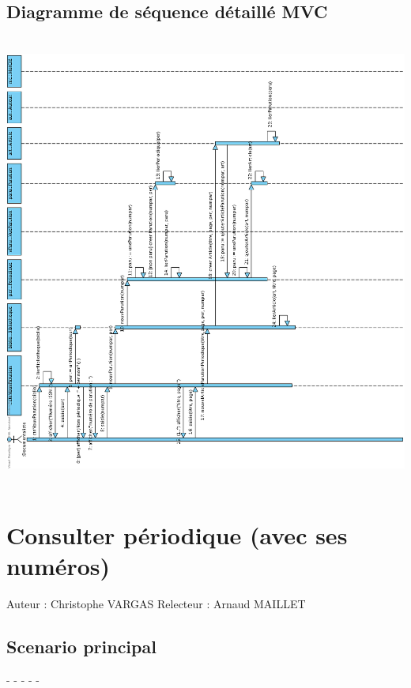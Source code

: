 \documentclass[a4paper,10pt]{report}
\begin{document}
\section*{Diagramme de séquence détaillé MVC}
\includegraphics[height=150mm]{NouvNumPerMVC.png}

\newpage


\chapter*{Consulter périodique (avec ses numéros)}

Auteur : Christophe VARGAS
Relecteur : Arnaud MAILLET

\bigskip
\section*{Scenario principal}
\begin{flushleft}
-
-
-
-
-
\end{flushleft}
\end{document}
